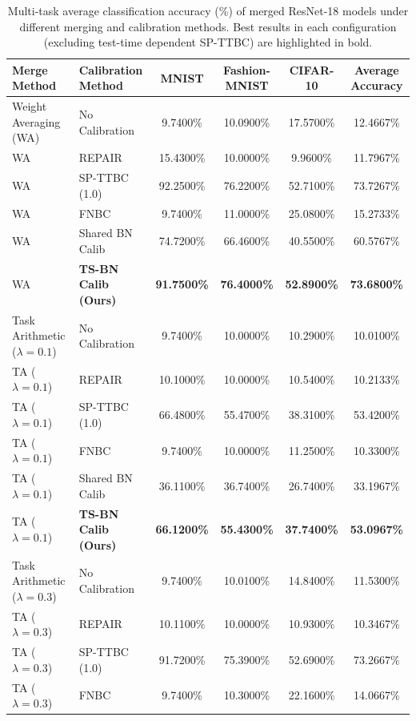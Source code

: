 \documentclass{article}
\theoremstyle{plain}
\theoremstyle{definition}
\theoremstyle{remark}
\begin{document}
\begin{table}[t]
\caption{Multi-task average classification accuracy (\%) of merged ResNet-18 models under different merging and calibration methods. Best results in each configuration (excluding test-time dependent SP-TTBC) are highlighted in bold.}
\label{tab:results}
\vskip 0.15in
\begin{center}
\begin{small}
\begin{tabular}{llcccc}
\toprule
Merge Method & Calibration Method & MNIST & Fashion-MNIST & CIFAR-10 & Average Accuracy \\
\midrule
Weight Averaging (WA) & No Calibration & 9.7400\% & 10.0900\% & 17.5700\% & 12.4667\% \\
WA & REPAIR & 15.4300\% & 10.0000\% & 9.9600\% & 11.7967\% \\
WA & SP-TTBC (1.0) & 92.2500\% & 76.2200\% & 52.7100\% & 73.7267\% \\
WA & FNBC & 9.7400\% & 11.0000\% & 25.0800\% & 15.2733\% \\
WA & Shared BN Calib & 74.7200\% & 66.4600\% & 40.5500\% & 60.5767\% \\
WA & \textbf{TS-BN Calib (Ours)} & \textbf{91.7500\%} & \textbf{76.4000\%} & \textbf{52.8900\%} & \textbf{73.6800\%} \\
\midrule
Task Arithmetic ($\lambda=0.1$) & No Calibration & 9.7400\% & 10.0000\% & 10.2900\% & 10.0100\% \\
TA ($\lambda=0.1$) & REPAIR & 10.1000\% & 10.0000\% & 10.5400\% & 10.2133\% \\
TA ($\lambda=0.1$) & SP-TTBC (1.0) & 66.4800\% & 55.4700\% & 38.3100\% & 53.4200\% \\
TA ($\lambda=0.1$) & FNBC & 9.7400\% & 10.0000\% & 11.2500\% & 10.3300\% \\
TA ($\lambda=0.1$) & Shared BN Calib & 36.1100\% & 36.7400\% & 26.7400\% & 33.1967\% \\
TA ($\lambda=0.1$) & \textbf{TS-BN Calib (Ours)} & \textbf{66.1200\%} & \textbf{55.4300\%} & \textbf{37.7400\%} & \textbf{53.0967\%} \\
\midrule
Task Arithmetic ($\lambda=0.3$) & No Calibration & 9.7400\% & 10.0100\% & 14.8400\% & 11.5300\% \\
TA ($\lambda=0.3$) & REPAIR & 10.1100\% & 10.0000\% & 10.9300\% & 10.3467\% \\
TA ($\lambda=0.3$) & SP-TTBC (1.0) & 91.7200\% & 75.3900\% & 52.6900\% & 73.2667\% \\
TA ($\lambda=0.3$) & FNBC & 9.7400\% & 10.3000\% & 22.1600\% & 14.0667\% \\

\end{tabular}
\end{small}
\end{center}
\end{table}
\end{document}
